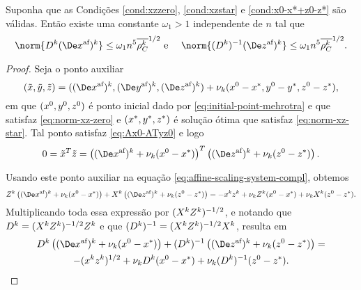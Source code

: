 \begin{lema}\label{lemma:boundDxDzaff}
	Suponha que as Condições \ref{cond:xzzero}, \ref{cond:xzstar} e \ref{cond:x0-x*+z0-z*} são válidas. Então existe uma constante $\omega_1>1$   independente de $n$ tal que 
	\begin{equation}
		\norm{\Dk  \dekx }\leq \omega_1 n^5\dbvec{\rho_C^{k}}^{1/2}\text{ e } \quad  \norm{\Dik  \dekz  }\leq \omega_1 n^5\dbvec{\rho_C^{k}}^{1/2}.
	\end{equation}
\end{lema}
\begin{proof}
	Seja o ponto auxiliar
	\[
		(\tilde{x},\tilde{y},\tilde{z})  = ( \dekx,  \deky  ,  \dekz  ) + \nu_k(\xzero - \xstar,\yzero - \ystar,\zzero - \zstar), 
	\]
em que $(x^0,y^0,z^0)$ é ponto inicial dado por \eqref{eq:initial-point-mehrotra} e que satisfaz \eqref{eq:norm-xz-zero} e  $(x^*,y^*,z^*)$ é  solução ótima que satisfaz \eqref{eq:norm-xz-star}.
	Tal ponto satisfaz \eqref{eq:Ax0-ATyz0} e logo 
	\begin{equation}
		\label{eq:DxDzaff1}
			 0 = \tilde{x}^{T}\tilde{z} = \left( \dekx +  \nu_k(\xzero - \xstar)\right)^{T}\left(  \dekz   +  \nu_k(\zzero - \zstar)\right).
	\end{equation}
	

	 Usando este ponto auxiliar na equação \eqref{eq:affine-scaling-system-compl}, obtemos 
	 \[
	 \Zk\left( \dekx +  \nu_k(\xzero - \xstar)\right)+ \Xk \left(  \dekz   +  \nu_k(\zzero - \zstar)\right) = -\xk\zk + \nu_k \Zk(\xzero - \xstar) + \nu_k \Xk(\zzero - \zstar).
	 \]
	 Multiplicando toda essa expressão por $(X^{k}Z^{k})^{-1/2}$, e notando que $D^{k}=(X^{k}Z^{k})^{-1/2}Z^{k}$ e que $(D^{k})^{-1}=(X^{k}Z^{k})^{-1/2}X^{k}$, resulta em 
	\begin{multline}
		\label{eq:DxDzaff2}
		 \Dk\left( \dekx  +  \nu_k(\xzero - \xstar)\right)+ \Dik \left(  \dekz   +  \nu_k(\zzero - \zstar)\right) = \\ -(\xk\zk)^{1/2} + \nu_k \Dk(\xzero - \xstar) + \nu_k \Dik(\zzero - \zstar).
		\end{multline}
	 

\end{proof}
